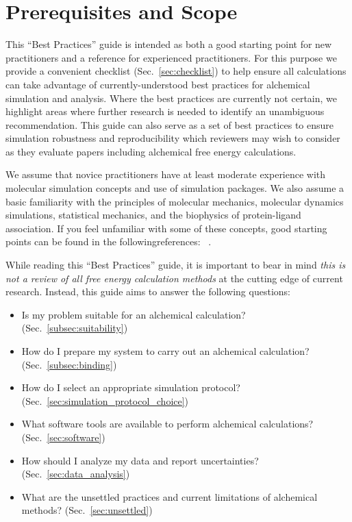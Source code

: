 \documentclass[9pt,bestpractices]{livecoms}
\begin{document}
\section{Prerequisites and Scope}
\label{sec:pre}

This ``Best Practices'' guide is intended as both a good starting point for new practitioners and a reference for experienced practitioners. 
For this purpose we provide a convenient checklist (Sec.~\ref{sec:checklist}) to help ensure all calculations can take advantage of currently-understood best practices for alchemical simulation and analysis. Where the best practices are currently not certain, we highlight areas where further research is needed to identify an unambiguous recommendation.
This guide can also serve as a set of best practices to ensure simulation robustness and reproducibility which reviewers may wish to consider as they evaluate papers including alchemical free energy calculations.

We assume that novice practitioners have at least moderate experience with molecular simulation concepts and use of simulation packages. 
We also assume a basic familiarity with the principles of molecular mechanics, molecular dynamics simulations, statistical mechanics, and the biophysics of protein-ligand association. If you feel unfamiliar with some of these concepts, good starting points can be found in the followingreferences: ~\cite{braun2019best, grossfield2018best, klimovich2015guidelines, shirts2012best}. 

 While reading this ``Best Practices'' guide, it is important to bear in mind \emph{this is not a review of all free energy calculation methods} at the cutting edge of current research.
Instead, this guide aims to answer the following questions:
\begin{itemize}
    \item Is my problem suitable for an alchemical calculation? (Sec.~\ref{subsec:suitability}) 
     \item How do I prepare my system to carry out an alchemical calculation? (Sec.~\ref{subsec:binding})
     \item How do I select an appropriate simulation protocol? (Sec.~\ref{sec:simulation_protocol_choice})
     \item What software tools are available to perform alchemical calculations? (Sec.~\ref{sec:software}) 
     \item How should I analyze my data and report uncertainties? (Sec.~\ref{sec:data_analysis})
     \item What are the unsettled practices and current limitations of alchemical methods? (Sec.~\ref{sec:unsettled})
\end{itemize}
\end{document}
